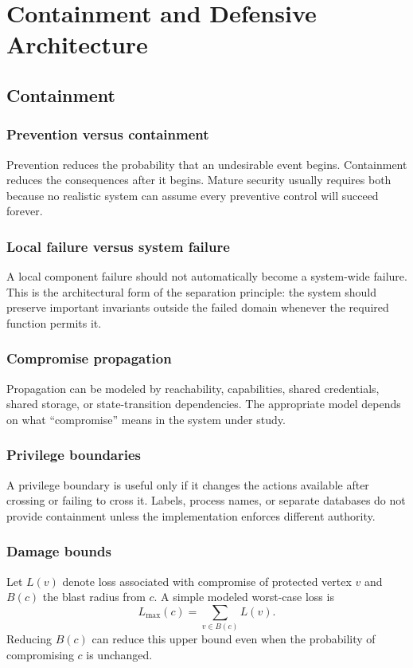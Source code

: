 \documentclass[11pt,oneside]{book}
\theoremstyle{definition}
\theoremstyle{remark}
\begin{document}
\part{Containment and Defensive Architecture}

\chapter{Containment}
\label{ch:containment}
\section{Prevention versus containment}
Prevention reduces the probability that an undesirable event begins. Containment reduces the consequences after it begins. Mature security usually requires both because no realistic system can assume every preventive control will succeed forever.

\section{Local failure versus system failure}
A local component failure should not automatically become a system-wide failure. This is the architectural form of the separation principle: the system should preserve important invariants outside the failed domain whenever the required function permits it.

\section{Compromise propagation}
Propagation can be modeled by reachability, capabilities, shared credentials, shared storage, or state-transition dependencies. The appropriate model depends on what ``compromise'' means in the system under study.

\section{Privilege boundaries}
A privilege boundary is useful only if it changes the actions available after crossing or failing to cross it. Labels, process names, or separate databases do not provide containment unless the implementation enforces different authority.

\section{Damage bounds}
Let $L(v)$ denote loss associated with compromise of protected vertex $v$ and $B(c)$ the blast radius from $c$. A simple modeled worst-case loss is
\[
L_{\max}(c)=\sum_{v\in B(c)}L(v).
\]
Reducing $B(c)$ can reduce this upper bound even when the probability of compromising $c$ is unchanged.
\end{document}

